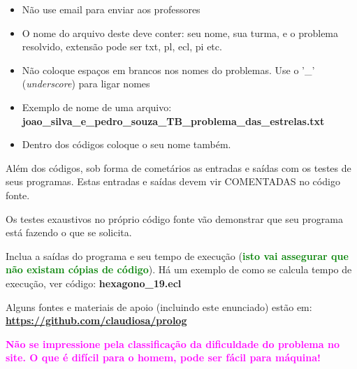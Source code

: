\documentclass[a4paper,12pt]{article}
\begin{document}
\begin{flushleft}
\begin{itemize}
  \item Não use email para enviar aos professores
  
  \item O nome do arquivo deste deve conter: seu nome,
  sua turma, e o problema resolvido, extensão pode ser txt, pl, ecl, pi etc.
  \item Não coloque espaços em brancos nos nomes do problemas. Use o '\_'  (\textit{underscore}) para ligar nomes
  \item Exemplo de nome de uma arquivo: \\ \textbf{joao\_silva\_e\_pedro\_souza\_TB\_problema\_das\_estrelas.txt}
  \item Dentro dos códigos coloque o seu nome também.
\end{itemize}


\vspace{0.5cm}
 Além dos códigos, sob forma de cometários as entradas e saídas com os testes de seus programas. Estas
entradas e saídas devem vir COMENTADAS no código fonte.

\vspace{0.5cm}
 Os testes exaustivos no próprio código fonte vão demonstrar que seu programa está fazendo o que se solicita.

\vspace{0.5cm}
 Inclua a saídas do programa e seu tempo de execução (\textbf{\textcolor{green}{isto vai assegurar que não existam cópias de código}}). Há um exemplo de como se calcula tempo de execução, ver código: \textbf{hexagono\_19.ecl}

\vspace{0.5cm}
 Alguns fontes e materiais de apoio (incluindo este enunciado) estão em: \textbf{\url{https://github.com/claudiosa/prolog}} 

\vspace{0.5cm}
 \textbf{\textcolor{magenta}{Não se impressione pela classificação da dificuldade do problema no site. O que é difícil para o homem, pode ser fácil para máquina!}}

\end{flushleft}
\end{document}
